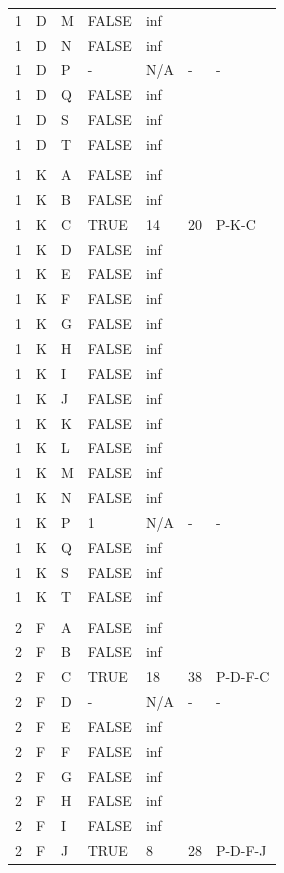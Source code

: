 \documentclass[11pt]{book}
\renewcommand{\=}[1]{\stackrel{#1}{=}} %
\theoremstyle{definition}
\theoremstyle{remark}
\begin{document}
\begin{longtable}{lllllll}
1 & D & M & FALSE & inf &  &  \\
1 & D & N & FALSE & inf &  &  \\
1 & D & P & - & N/A & - & - \\
1 & D & Q & FALSE & inf &  &  \\
1 & D & S & FALSE & inf &  &  \\
1 & D & T & FALSE & inf &  &  \\
 &  &  &  &  &  &  \\
1 & K & A & FALSE & inf &  &  \\
1 & K & B & FALSE & inf &  &  \\
1 & K & C & TRUE & 14 & 20 & P-K-C \\
1 & K & D & FALSE & inf &  &  \\
1 & K & E & FALSE & inf &  &  \\
1 & K & F & FALSE & inf &  &  \\
1 & K & G & FALSE & inf &  &  \\
1 & K & H & FALSE & inf &  &  \\
1 & K & I & FALSE & inf &  &  \\
1 & K & J & FALSE & inf &  &  \\
1 & K & K & FALSE & inf &  &  \\
1 & K & L & FALSE & inf &  &  \\
1 & K & M & FALSE & inf &  &  \\
1 & K & N & FALSE & inf &  &  \\
1 & K & P & 1 & N/A & - & - \\
1 & K & Q & FALSE & inf &  &  \\
1 & K & S & FALSE & inf &  &  \\
1 & K & T & FALSE & inf &  &  \\
 &  &  &  &  &  &  \\
2 & F & A & FALSE & inf &  &  \\
2 & F & B & FALSE & inf &  &  \\
2 & F & C & TRUE & 18 & 38 & P-D-F-C \\
2 & F & D & - & N/A & - & - \\
2 & F & E & FALSE & inf &  &  \\
2 & F & F & FALSE & inf &  &  \\
2 & F & G & FALSE & inf &  &  \\
2 & F & H & FALSE & inf &  &  \\
2 & F & I & FALSE & inf &  &  \\
2 & F & J & TRUE & 8 & 28 & P-D-F-J \\

\end{longtable}
\end{document}
